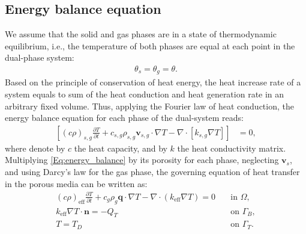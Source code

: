 \subsection{Energy balance equation} %
We assume that the solid and gas phases are in a state of thermodynamic equilibrium, i.e., the temperature of both phases are equal at each point in the dual-phase system:
\begin{equation} \label{Eq:thermo_equilibrium}
\begin{aligned}
\theta_s=\theta_g=\theta.
\end{aligned}
\end{equation}
Based on the principle of conservation of heat energy, the heat increase rate of a system equals to sum of the heat conduction and heat generation rate in an arbitrary fixed volume.
Thus, applying the Fourier law of heat conduction, the energy balance equation for each phase of the dual-system reads:
\begin{equation}\label{Eq:energy_balance}
\begin{aligned}
\left[(c\rho)_{s,g}\frac{\partial T}{\partial t}+c_{s,g}\rho_{s,g}\mathbf{v}_{s,g}\cdot\nabla T - \nabla\cdot\left[{k}_{s,g}\nabla T \right] \right] &=0,
\end{aligned}
\end{equation}
where denote by $c$ the heat capacity, and by ${k}$ the heat conductivity matrix. 
Multiplying \eqref{Eq:energy_balance} by its porosity for each phase, neglecting $\mathbf{v}_{s}$, and using Darcy's law for the gas phase, the governing equation of heat transfer in the porous media can be written as:
\begin{equation} \label{Eq:bulk_heat_transfer}
\begin{aligned}
\left(c\rho\right)_{\text{eff}} \frac{\partial T}{\partial t} +c_g\rho_g \mathbf{q}\cdot \nabla T -\nabla\cdot\left({k}_{\text{eff}}\nabla T\right) =0 \quad  &\text{in~} \Omega,\\
{k}_{\text{eff}}\nabla T\cdot\mathbf{n} =-Q_T \quad &\text{on~} \Gamma_B,\\
T = T_D \quad&\text{on~}\Gamma_T.
\end{aligned}
\end{equation}
